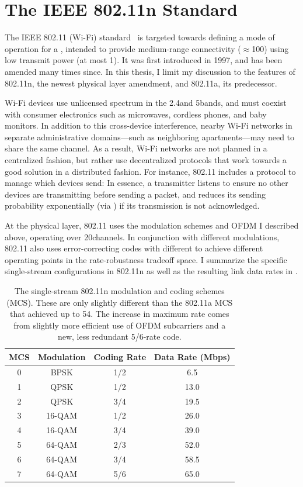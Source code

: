 \section{The IEEE 802.11n Standard}
The IEEE 802.11 (Wi-Fi) standard~\cite{80211} is targeted towards defining a mode of operation for a , intended to provide medium-range connectivity ($\approx$100\m) using low transmit power (at most 1\W). It was first introduced in 1997, and has been amended many times since. In this thesis, I limit my discussion to the features of 802.11n, the newest physical layer amendment, and 802.11a, its predecessor.

Wi-Fi devices use unlicensed spectrum in the 2.4\GHz and 5\GHz bands, and must coexist with consumer electronics such as microwaves, cordless phones, and baby monitors. In addition to this cross-device interference, nearby Wi-Fi networks in separate administrative domains---such as neighboring apartments---may need to share the same channel. As a result, Wi-Fi networks are not planned in a centralized fashion, but rather use decentralized protocols that work towards a good solution in a distributed fashion. For instance, 802.11 includes a  protocol to manage which devices send: In essence, a transmitter listens to ensure no other devices are transmitting before sending a packet, and reduces its sending probability exponentially (via ) if its transmission is not acknowledged.

At the physical layer, 802.11 uses the modulation schemes and OFDM I described above, operating over 20\MHz channels. In conjunction with different modulations, 802.11 also uses error-correcting codes with different  to achieve different operating points in the rate-robustness tradeoff space. I summarize the specific single-stream configurations in 802.11n as well as the resulting link data rates in .

\begin{table}[t]
\centering
\begin{tabular}{cccc}
\toprule
MCS & Modulation & Coding Rate & Data Rate (Mbps) \\
\midrule
0 & BPSK & 1/2 & 6.5 \\
1 & QPSK & 1/2 & 13.0\\
2 & QPSK & 3/4 & 19.5\\
3 & 16-QAM & 1/2 & 26.0\\
4 & 16-QAM & 3/4 & 39.0\\
5 & 64-QAM & 2/3 & 52.0\\
6 & 64-QAM & 3/4 & 58.5\\
7 & 64-QAM & 5/6 & 65.0\\
\bottomrule
\end{tabular}
\caption[The 802.11n single-stream rates]{\label{tab:siso_mcs} The single-stream 802.11n modulation and coding schemes (MCS). These are only slightly different than the 802.11a MCS that achieved up to 54\Mbps. The increase in maximum rate comes from slightly more efficient use of OFDM subcarriers and a new, less redundant 5/6-rate code.}
\end{table}


